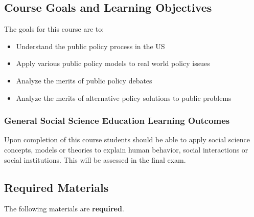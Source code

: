 \hypertarget{course-goals-and-learning-objectives}{%
\subsection{Course Goals and Learning
Objectives}\label{course-goals-and-learning-objectives}}

The goals for this course are to:

\begin{itemize}
\item
  Understand the public policy process in the US
\item
  Apply various public policy models to real world policy issues
\item
  Analyze the merits of public policy debates
\item
  Analyze the merits of alternative policy solutions to public problems
\end{itemize}

\hypertarget{general-social-science-education-learning-outcomes}{%
\subsubsection{General Social Science Education Learning
Outcomes}\label{general-social-science-education-learning-outcomes}}

Upon completion of this course students should be able to apply social
science concepts, models or theories to explain human behavior, social
interactions or social institutions. This will be assessed in the final
exam.

\hypertarget{required-materials}{%
\subsection{Required Materials}\label{required-materials}}

The following materials are \textbf{required}.

